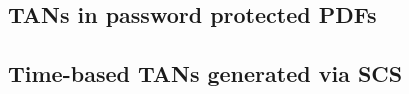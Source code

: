 \clearpage
\subsection{TANs in password protected PDFs}

\clearpage
\subsection{Time-based TANs generated via SCS}
